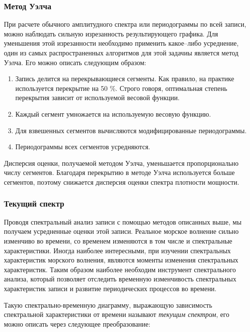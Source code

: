 \subsubsection{Метод Уэлча }

При расчете обычного амплитудного спектра или периодограммы по всей записи, можно наблюдать сильную изрезанность результирующего графика. Для уменьшения этой изрезанности необходимо применить какое--либо усреднение, один из самых распространенных алгоритмов для этой задачиы является метод Уэлча. Его можно описать следующим образом:
\begin{enumerate}
\item  Запись делится на перекрывающиеся сегменты. Как правило, на практике используется перекрытие на 50 \%. Строго говоря, оптимальная степень перекрытия зависит от используемой весовой функции.

\item  Каждый сегмент умножается на используемую весовую функцию.

\item  Для взвешенных сегментов вычисляются модифицированные периодограммы.

\item  Периодограммы всех сегментов усредняются.
\end{enumerate}

Дисперсия оценки, получаемой методом Уэлча, уменьшается пропорционально числу сегментов. Благодаря перекрытию в методе Уэлча используется больше сегментов, поэтому снижается дисперсия оценки спектра плотности мощности.


\subsubsection{Текущий спектр}

Проводя спектральный анализ записи с помощью методов описанных выше, мы получаем усредненные оценки этой записи. Реальное морское волнение сильно изменчиво во времени, со временем изменяются в том числе и спектральные характеристики. Иногда наиболее интересными, при изучении спектральных характеристик морского волнения, являются моменты изменения спектральных характеристик. Таким образом наиболее необходим инструмент спектрального анализа, который позволяет отследить временную изменчивость спектральных характеристик записи и развитие периодических процессов во времени.

Такую спектрально-временную диаграмму, выражающую зависимость спектральной характеристики от времени называют \emph{текущим спектром}, его можно описать через следующее преобразование:

